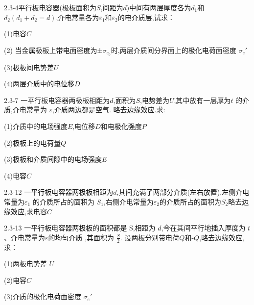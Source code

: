 \documentclass{article}
\begin{document}
2.3-4平行板电容器(极板面积为$S$,间距为$d)$中间有两层厚度各为$d_1$和$d_2(d_1+d_2=d)$,介电常量各为$\varepsilon_1$和$\varepsilon_2$的电介质层,试求：

(1)电容$C$

(2) 当金属极板上带电面密度为±$\sigma_{e_0}$时,两层介质间分界面上的极化电荷面密度 $\sigma_e'$

(3)极板间电势差$U$

(4)两层介质中的电位移$D$





\newpage

2.3-7 一平行板电容器两极板相距为$d$,面积为$S$,电势差为$U$,其中放有一层厚为$t$ 的介质,介电常量为 $\varepsilon$,介质两边都是空气. 略去边缘效应.求:

(1)介质中的电场强度$E$,电位移$D$和电极化强度$P$

(2)极板上的电荷量$Q$

(3)极板和介质间隙中的电场强度$E$

(4)电容$C$









\newpage

2.3-12 一平行板电容器两极板相距为$d$,其间充满了两部分介质(左右放置),左侧介电常量为$\varepsilon_1$ 的介质所占的面积为 $S_1$,右侧介电常量为$\varepsilon_2$的介质所占的面积为$S_2$略去边缘效应,求电容$C$
















\newpage

2.3-13 一平行板电容器两极板的面积都是 S,相距为 $d$,今在其间平行地插入厚度为 $t$、介电常量为$\varepsilon$的均匀介质 ,其面积为 $\frac{S}{2}$. 设两板分别带电荷$Q$和-$Q$,略去边缘效应,求：

(1)两板电势差 $U$

(2)电容$C$

(3)介质的极化电荷面密度 $\sigma_e'$
\end{document}
